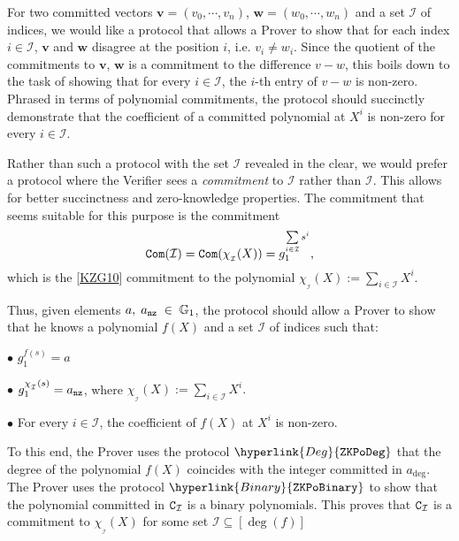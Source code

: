 \documentclass[11pt, lettersize, notitlepage, leqno, footskip=0.6cm]{article}
\newcommand{\mc}{\mathcal}
\newcommand{\mb}{\mathbb}
\newcommand{\mbf}{\mathbf}
\newcommand{\ov}{\overline}
\newcommand{\sub}{\subseteq}
\newcommand{\vs}{\vspace{-0.15cm}}
\newcommand{\noin}{\noindent}
\numberwithin{equation}{section}
\begin{document}
For two committed vectors $\mbf{v} = (v_0,\cdots,v_n)$, $\mbf{w} = (w_0,\cdots,w_n)$ and a set $\mc{I}$ of indices, we would like a protocol that allows a Prover to show that for each index $i\in \mc{I}$, $\mbf{v}$ and $\mbf{w}$ disagree at the position $i$, i.e. $v_i\neq w_i$. Since the quotient of the commitments to $\mbf{v}$, $\mbf{w}$ is a commitment to the difference $v-w$, this boils down to the task of showing that for every $i\in \mc{I}$, the $i$-th entry of $v-w$ is non-zero. Phrased in terms of polynomial commitments, the protocol should succinctly demonstrate that the coefficient of a committed polynomial at $X^i$ is non-zero for every $i\in \mc{I}$.

Rather than such a protocol with the set $\mc{I}$ revealed in the clear, we would prefer a protocol where the Verifier sees a \textit{commitment} to $\mc{I}$ rather than $\mc{I}$. This allows for better succinctness and zero-knowledge properties. The commitment that seems suitable for this purpose is the commitment \vs $$ {\tt{Com}}(\mc{I}) = {\tt{Com}}(\chi_{_\mc{I}}(X)) = g_1^{\sum\limits_{i\in \mc{I}} s^i},       $$ which is the [\hyperlink{KZG}{\hyperlink{KZG}{\hyperlink{KZG}{KZG10}}}] commitment to the polynomial $\chi_{_\mc{I}}(X):= \sum\limits_{i\in \mc{I}} X^i$.

Thus, given elements $a,\; a_{\tt{nz}}\;\in\; \mb{G}_1$, the protocol should allow a Prover to show that he knows a polynomial $f(X)$ and a set $\mc{I}$ of indices such that: \vspace{2mm}

\noin $\bullet$ $g_1^{f(s)} = a$ \vspace{1mm}

\noin $\bullet$ $g_1^{\chi_{_\mc{I}}(s)} =a_{\tt{nz}}$, where $\chi_{_\mc{I}}(X):= \sum\limits_{i\in \mc{I}} X^i. $ \vspace{1mm}

\noin $\bullet$ For every $i\in \mc{I}$, the coefficient of $f(X)$ at $X^i$ is non-zero. \vspace{2mm}



To this end, the Prover uses the protocol $\hyperlink{Deg}{\tt{ZKPoDeg}}$ that the degree of the polynomial $f(X)$ coincides with the integer committed in $a_{\deg}$. The Prover uses the protocol $\hyperlink{Binary}{\tt{ZKPoBinary}}$ to show that the polynomial committed in ${{\tt{C}}_{\mc{I}}}$ is a binary polynomials. This proves that ${{\tt{C}}_{\mc{I}}}$ is a commitment to $\chi_{_\mc{I}}(X)$ for some set $\mc{I}\sub [\deg(f)]$
\end{document}
